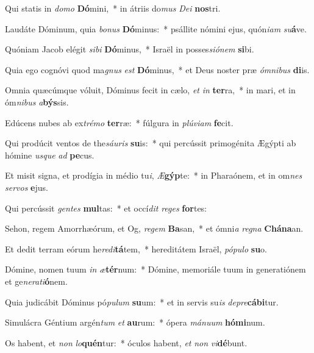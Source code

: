 \item Qui statis in \textit{do}\textit{mo} \textbf{Dó}mini,~* in átriis do\textit{mus} \textit{De}\textit{i} \textbf{nos}tri.
\item Laudáte Dóminum, quia \textit{bo}\textit{nus} \textbf{Dó}minus:~* psállite nómini ejus, quón\textit{i}\textit{am} \textit{su}\textbf{á}ve.
\item Quóniam Jacob elégit \textit{si}\textit{bi} \textbf{Dó}minus,~* Israël in posses\textit{si}\textit{ó}\textit{nem} \textbf{si}bi.
\item Quia ego cognóvi quod ma\textit{gnus} \textit{est} \textbf{Dó}minus,~* et Deus noster præ \textit{óm}\textit{ni}\textit{bus} \textbf{di}is.
\item Omnia quæcúmque vóluit, Dóminus fecit in cælo, \textit{et} \textit{in} \textbf{ter}ra,~* in mari, et in óm\textit{ni}\textit{bus} \textit{a}\textbf{býs}sis.
\item Edúcens nubes ab ex\textit{tré}\textit{mo} \textbf{ter}ræ:~* fúlgura in \textit{plú}\textit{vi}\textit{am} \textbf{fe}cit.
\item Qui prodúcit ventos de the\textit{sáu}\textit{ris} \textbf{su}is:~* qui percússit primogénita Ægýpti ab hómine \textit{us}\textit{que} \textit{ad} \textbf{pe}cus.
\item Et misit signa, et prodígia in médio tu\textit{i}, \textit{Æ}\textbf{gýp}te:~* in Pharaónem, et in om\textit{nes} \textit{ser}\textit{vos} \textbf{e}jus.
\item Qui percússit \textit{gen}\textit{tes} \textbf{mul}tas:~* et occí\textit{dit} \textit{re}\textit{ges} \textbf{for}tes:
\item Sehon, regem Amorrhæórum, et Og, \textit{re}\textit{gem} \textbf{Ba}san,~* et ómni\textit{a} \textit{re}\textit{gna} \textbf{Chá}\textbf{na}an.
\item Et dedit terram eórum he\textit{re}\textit{di}\textbf{tá}tem,~* hereditátem Israël, \textit{pó}\textit{pu}\textit{lo} \textbf{su}o.
\item Dómine, nomen tuum \textit{in} \textit{æ}\textbf{tér}num:~* Dómine, memoriále tuum in generatiónem et ge\textit{ne}\textit{ra}\textit{ti}\textbf{ó}nem.
\item Quia judicábit Dóminus pó\textit{pu}\textit{lum} \textbf{su}um:~* et in servis su\textit{is} \textit{de}\textit{pre}\textbf{cá}\textbf{bi}tur.
\item Simulácra Géntium argén\textit{tum} \textit{et} \textbf{au}rum:~* ópera \textit{má}\textit{nu}\textit{um} \textbf{hó}\textbf{mi}num.
\item Os habent, et \textit{non} \textit{lo}\textbf{quén}tur:~* óculos habent, \textit{et} \textit{non} \textit{vi}\textbf{dé}bunt.
